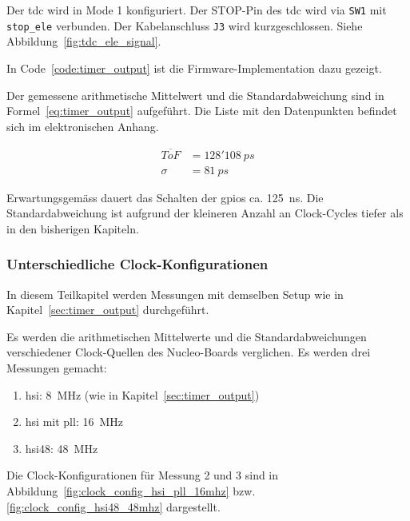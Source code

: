 \documentclass[11pt,a4paper,hidelinks]{article}
\begin{document}
Der \acrshort{tdc} wird in Mode 1 konfiguriert. Der STOP-Pin des \acrshort{tdc} wird via \lstinline|SW1| mit
\lstinline|stop_ele| verbunden. Der Kabelanschluss \lstinline|J3| wird kurzgeschlossen. Siehe
Abbildung~\ref{fig:tdc_ele_signal}.

In Code~\ref{code:timer_output} ist die Firmware-Implementation dazu gezeigt.



Der gemessene arithmetische Mittelwert und die Standardabweichung sind in Formel~\ref{eq:timer_output} aufgeführt.  Die
Liste mit den Datenpunkten befindet sich im elektronischen Anhang.

\begin{equation}\label{eq:timer_output}
    \begin{split}
        \overline{ToF} &=128'108~ps\\
        \sigma         &= 81~ps
    \end{split}
\end{equation}

Erwartungsgemäss dauert das Schalten der \acrshort{gpio}s ca. 125~ns. Die Standardabweichung ist aufgrund der kleineren
Anzahl an Clock-Cycles tiefer als in den bisherigen Kapiteln.

\subsubsection{Unterschiedliche Clock-Konfigurationen}

In diesem Teilkapitel werden Messungen mit demselben Setup wie in Kapitel~\ref{sec:timer_output} durchgeführt.

Es werden die arithmetischen Mittelwerte und die Standardabweichungen verschiedener Clock-Quellen des Nucleo-Boards
verglichen. Es werden drei Messungen gemacht:

\begin{enumerate}
    \item \acrshort{hsi}: 8~MHz (wie in Kapitel~\ref{sec:timer_output})
    \item \acrshort{hsi} mit \acrshort{pll}: 16~MHz
    \item \acrshort{hsi}48: 48~MHz
\end{enumerate}

Die Clock-Konfigurationen für Messung 2 und 3 sind in Abbildung~\ref{fig:clock_config_hsi_pll_16mhz} bzw.
\ref{fig:clock_config_hsi48_48mhz} dargestellt.
\end{document}
